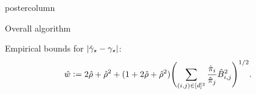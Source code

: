 \documentclass[notheorems,final]{beamer}
\newcommand\gap{\ensuremath{\gamma_{\star}}}
\newcommand\hatgap{\ensuremath{\hat{\gamma}_{\star}}}
\begin{document}
\begin{frame}{}
\begin{columns}
\begin{column}{0.24\textwidth}
\begin{beamercolorbox}[center,wd=\textwidth]{postercolumn}
\begin{minipage}[T]{.95\textwidth}
{\begin{block}{Overall algorithm}
\begin{algorithmic}[1]
                  \STATE Empirical bounds for $\abs{\hatgap-\gap}$:
                  \begin{equation}
                    \hat{w} := 2\hat\rho + \hat\rho^2
                    + (1+2\hat\rho+\hat\rho^2)
                    \Biggl(
                      \sum_{(i,j)\in[d]^2} \frac{\hat\pi_i}{\hat\pi_j} \hat{B}_{i,j}^2
                    \Biggr)^{1/2} .
                    \notag
                  \end{equation}

                \end{algorithmic}
              \end{block}

            }
          \end{minipage}
        \end{beamercolorbox}
      \end{column}
    \end{columns}

    \vfill
  \end{frame}
\end{document}
